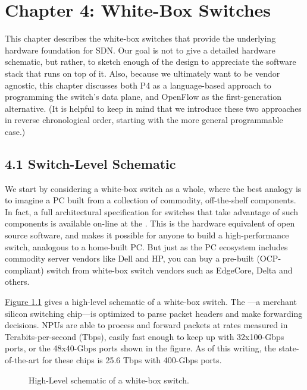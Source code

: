 \documentclass[letterpaper,11pt,english]{sphinxmanual}
\let\sphinxpxdimen\pdfpxdimen\else\newdimen\sphinxpxdimen
\begin{document}
\chapter{Chapter 4:  White-Box Switches}
\label{\detokenize{switch:chapter-4-white-box-switches}}\label{\detokenize{switch::doc}}
This chapter describes the white-box switches that provide the
underlying hardware foundation for SDN. Our goal is not to give a
detailed hardware schematic, but rather, to sketch enough of the
design to appreciate the software stack that runs on top of it. Also,
because we ultimately want to be vendor agnostic, this chapter
discusses both P4 as a language-based approach to programming the
switch’s data plane, and OpenFlow as the first-generation alternative.
(It is helpful to keep in mind that we introduce these two approaches
in reverse chronological order, starting with the more general
programmable case.)


\section{4.1 Switch-Level Schematic}
\label{\detokenize{switch:switch-level-schematic}}
We start by considering a white-box switch as a whole, where the best
analogy is to imagine a PC built from a collection of commodity,
off-the-shelf components. In fact, a full architectural specification
for switches that take advantage of such components is available
on-line at the . This is the hardware
equivalent of open source software, and makes it possible for anyone
to build a high-performance switch, analogous to a home-built PC. But
just as the PC ecosystem includes commodity server vendors like Dell
and HP, you can buy a pre-built (OCP-compliant) switch from white-box
switch vendors such as EdgeCore, Delta and others.

\hyperref[\detokenize{switch:fig-switch}]{Figure \ref{\detokenize{switch:fig-switch}}} gives a high-level schematic of a
white-box switch. The —a merchant
silicon switching chip—is optimized to parse packet headers and make
forwarding decisions. NPUs are able to process and forward packets at
rates measured in Terabits-per-second (Tbps), easily fast enough to
keep up with 32x100-Gbps ports, or the 48x40-Gbps ports shown in the
figure. As of this writing, the state-of-the-art for these chips is
25.6 Tbps with 400-Gbps ports.

\begin{figure}[htbp]
\centering
\capstart

\noindent\sphinxincludegraphics[width=500\sphinxpxdimen]{{Slide10}.png}
\caption{High-Level schematic of a white-box switch.}\label{\detokenize{switch:id9}}\label{\detokenize{switch:fig-switch}}\end{figure}
\end{document}
